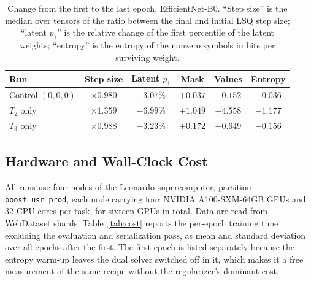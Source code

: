 \documentclass{article}
\begin{document}
\begin{table}[!ht]
  \caption{Change from the first to the last epoch, EfficientNet-B0.
  ``Step size'' is the median over tensors of the ratio between the final and
  initial LSQ step size; ``latent $p_1$'' is the relative change of the first
  percentile of the latent weights; ``entropy'' is the entropy of the nonzero
  symbols in bits per surviving weight.}
  \label{tab:mechanism}
  \centering
  \small
  \setlength{\tabcolsep}{5pt}
  \begin{tabular}{lccccc}
    \toprule
    Run & Step size & Latent $p_1$ & Mask & Values & Entropy \\
    \midrule
    Control $(0,0,0)$ & $\times 0.980$ & $-3.07\%$ & $+0.037$ & $-0.152$ & $-0.036$ \\
    $T_2$ only & $\times 1.359$ & $-6.99\%$ & $+1.049$ & $-4.558$ & $-1.177$ \\
    $T_3$ only & $\times 0.988$ & $-3.23\%$ & $+0.172$ & $-0.649$ & $-0.156$ \\
    \bottomrule
  \end{tabular}
\end{table}

\FloatBarrier

\subsection{Hardware and Wall-Clock Cost}
\label{app:cost2}
\label{app:cost}

All runs use four nodes of the Leonardo supercomputer, partition
\texttt{boost\_usr\_prod}, each node carrying four NVIDIA A100-SXM-64GB GPUs and
32 CPU cores per task, for sixteen GPUs in total. Data are read from WebDataset
shards. Table~\ref{tab:cost} reports the per-epoch training time excluding the
evaluation and serialization pass, as mean and standard deviation over all
epochs after the first. The first epoch is listed separately because the entropy
warm-up leaves the dual solver switched off in it, which makes it a free
measurement of the same recipe without the regularizer's dominant cost.
\end{document}
